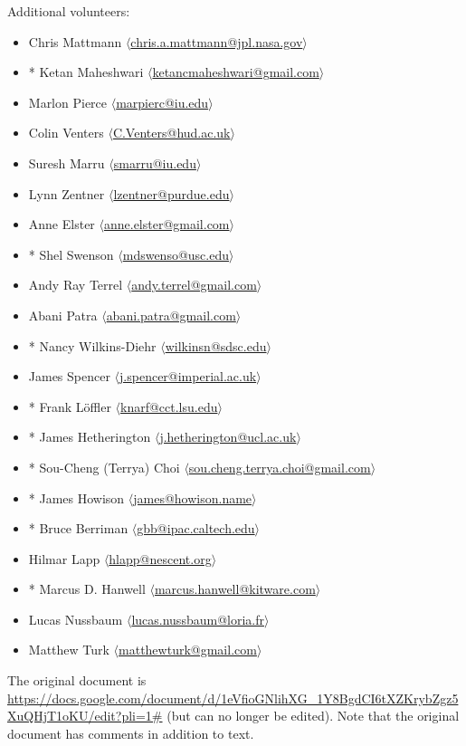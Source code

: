 \documentclass[11pt, oneside]{amsart}
\begin{document}
Additional volunteers:
\begin{itemize}
\item Chris Mattmann $\langle$\url{chris.a.mattmann@jpl.nasa.gov}$\rangle$
\item * Ketan Maheshwari $\langle$\url{ketancmaheshwari@gmail.com}$\rangle$
\item Marlon Pierce $\langle$\url{marpierc@iu.edu}$\rangle$
\item Colin Venters $\langle$\url{C.Venters@hud.ac.uk}$\rangle$
\item Suresh Marru $\langle$\url{smarru@iu.edu}$\rangle$
\item Lynn Zentner $\langle$\url{lzentner@purdue.edu}$\rangle$
\item Anne Elster $\langle$\url{anne.elster@gmail.com}$\rangle$
\item * Shel Swenson $\langle$\url{mdswenso@usc.edu}$\rangle$
\item Andy Ray Terrel $\langle$\url{andy.terrel@gmail.com}$\rangle$
\item Abani Patra $\langle$\url{abani.patra@gmail.com}$\rangle$
\item * Nancy Wilkins-Diehr $\langle$\url{wilkinsn@sdsc.edu}$\rangle$
\item James Spencer $\langle$\url{j.spencer@imperial.ac.uk}$\rangle$
\item * Frank L\"{o}ffler $\langle$\url{knarf@cct.lsu.edu}$\rangle$
\item * James Hetherington $\langle$\url{j.hetherington@ucl.ac.uk}$\rangle$
\item * Sou-Cheng (Terrya) Choi $\langle$\url{sou.cheng.terrya.choi@gmail.com}$\rangle$
\item * James Howison $\langle$\url{james@howison.name}$\rangle$
\item * Bruce Berriman $\langle$\url{gbb@ipac.caltech.edu}$\rangle$
\item Hilmar Lapp $\langle$\url{hlapp@nescent.org}$\rangle$
\item * Marcus D. Hanwell $\langle$\url{marcus.hanwell@kitware.com}$\rangle$
\item Lucas Nussbaum $\langle$\url{lucas.nussbaum@loria.fr}$\rangle$
\item Matthew Turk $\langle$\url{matthewturk@gmail.com}$\rangle$
\end{itemize}

The original document is
\url{https://docs.google.com/document/d/1eVfioGNlihXG_1Y8BgdCI6tXZKrybZgz5XuQHjT1oKU/edit?pli=1#}
(but can no longer be edited).  Note that the original document has
comments in addition to text.
\end{document}
